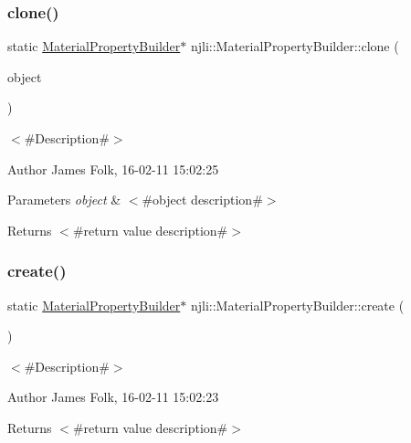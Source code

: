 \subsubsection{\texorpdfstring{clone()}{clone()}}
{\footnotesize\ttfamily static \mbox{\hyperlink{classnjli_1_1_material_property_builder}{Material\+Property\+Builder}}$\ast$ njli\+::\+Material\+Property\+Builder\+::clone (\begin{DoxyParamCaption}\item[{const \mbox{\hyperlink{classnjli_1_1_material_property_builder}{Material\+Property\+Builder}} \&}]{object }\end{DoxyParamCaption})\hspace{0.3cm}{\ttfamily [static]}}



$<$\#\+Description\#$>$ 

\begin{DoxyAuthor}{Author}
James Folk, 16-\/02-\/11 15\+:02\+:25
\end{DoxyAuthor}

\begin{DoxyParams}{Parameters}
{\em object} & $<$\#object description\#$>$\\
\hline
\end{DoxyParams}
\begin{DoxyReturn}{Returns}
$<$\#return value description\#$>$ 
\end{DoxyReturn}
\mbox{\label{classnjli_1_1_material_property_builder_aa218b51e5135a0aabf2b8993ad6bdb3e}} 
\subsubsection{\texorpdfstring{create()}{create()}}
{\footnotesize\ttfamily static \mbox{\hyperlink{classnjli_1_1_material_property_builder}{Material\+Property\+Builder}}$\ast$ njli\+::\+Material\+Property\+Builder\+::create (\begin{DoxyParamCaption}{ }\end{DoxyParamCaption})\hspace{0.3cm}{\ttfamily [static]}}



$<$\#\+Description\#$>$ 

\begin{DoxyAuthor}{Author}
James Folk, 16-\/02-\/11 15\+:02\+:23
\end{DoxyAuthor}
\begin{DoxyReturn}{Returns}
$<$\#return value description\#$>$ 
\end{DoxyReturn}
\mbox{\label{classnjli_1_1_material_property_builder_a7d117421edfceed2888f291142723835}} 
